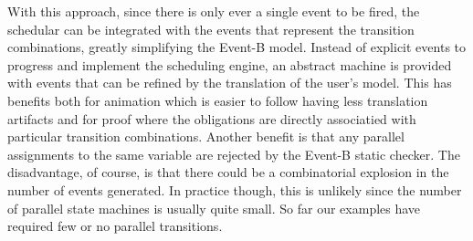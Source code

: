 With this approach, since there is only ever a single event to be fired, the schedular can be integrated with the events that represent the transition combinations, greatly simplifying the Event-B model.
Instead of explicit events to progress and implement the scheduling engine, an abstract machine is provided with events that can be refined by the translation of the user's \SCXML model.
This has benefits both for animation which is easier to follow having less translation artifacts and for proof where the obligations are directly associatied with particular transition combinations. 
Another benefit is that any parallel assignments to the same variable are rejected by the Event-B static checker.
The disadvantage, of course, is that there could be a combinatorial explosion in the number of events generated.
In practice though, this is unlikely since the number of parallel state machines is usually quite small.
So far our examples have required few or no parallel transitions.


